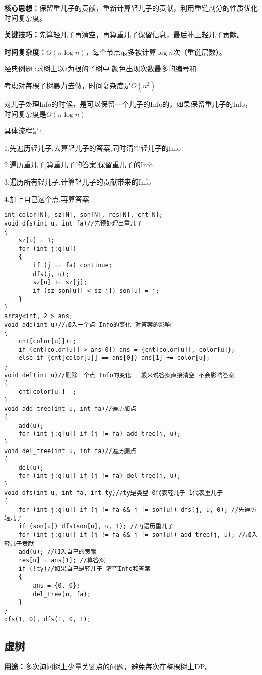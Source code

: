 \documentclass[a4paper, fontset=none]{ctexart}
\begin{document}
\textbf{核心思想：}保留重儿子的贡献，重新计算轻儿子的贡献，利用重链剖分的性质优化时间复杂度。

\textbf{关键技巧：}先算轻儿子再清空，再算重儿子保留信息，最后补上轻儿子贡献。

\textbf{时间复杂度：}$O(n\log n)$，每个节点最多被计算$\log n$次（重链层数）。

经典例题 :求树上以$i$为根的子树中 颜色出现次数最多的编号和

考虑对每棵子树暴力去做，时间复杂度是$O(n ^ 2)$

对儿子处理Info的时候，是可以保留一个儿子的Info的，如果保留重儿子的Info，时间复杂度是$O(n\log n)$

具体流程是:

1.先遍历轻儿子,去算轻儿子的答案,同时清空轻儿子的Info

2.遍历重儿子,算重儿子的答案,保留重儿子的Info

3.遍历所有轻儿子,计算轻儿子的贡献带来的Info

4.加上自己这个点,再算答案

\begin{verbatim}
int color[N], sz[N], son[N], res[N], cnt[N];
void dfs(int u, int fa)//先预处理出重儿子
{
    sz[u] = 1;
    for (int j:g[u])
    {
        if (j == fa) continue;
        dfs(j, u);
        sz[u] += sz[j];
        if (sz[son[u]] < sz[j]) son[u] = j;
    }
}
array<int, 2 > ans;
void add(int u)//加入一个点 Info的变化 对答案的影响
{
    cnt[color[u]]++;
    if (cnt[color[u]] > ans[0]) ans = {cnt[color[u]], color[u]};
    else if (cnt[color[u]] == ans[0]) ans[1] += color[u];
}
void del(int u)//删除一个点 Info的变化 一般来说答案直接清空 不会影响答案
{
    cnt[color[u]]--;
}
void add_tree(int u, int fa)//遍历加点
{
    add(u);
    for (int j:g[u]) if (j != fa) add_tree(j, u);
}
void del_tree(int u, int fa)//遍历删点
{
    del(u);
    for (int j:g[u]) if (j != fa) del_tree(j, u);
}
void dfs(int u, int fa, int ty)//ty是类型 0代表轻儿子 1代表重儿子
{
    for (int j:g[u]) if (j != fa && j != son[u]) dfs(j, u, 0); //先遍历轻儿子
    if (son[u]) dfs(son[u], u, 1); //再遍历重儿子
    for (int j:g[u]) if (j != fa && j != son[u]) add_tree(j, u); //加入轻儿子贡献
    add(u); //加入自己的贡献
    res[u] = ans[1]; //算答案
    if (!ty)//如果自己是轻儿子 清空Info和答案
    {
        ans = {0, 0};
        del_tree(u, fa);
    }
}
dfs(1, 0), dfs(1, 0, 1);
\end{verbatim}
\subsection{虚树}
\textbf{用途：}多次询问树上少量关键点的问题，避免每次在整棵树上DP。
\end{document}
